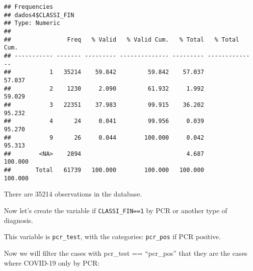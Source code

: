 \documentclass[
]{article}
\newenvironment{Shaded}{\begin{snugshade}}{\end{snugshade}}
\newcommand{\CommentTok}[1]{\textcolor[rgb]{0.56,0.35,0.01}{\textit{#1}}}
\newcommand{\DataTypeTok}[1]{\textcolor[rgb]{0.13,0.29,0.53}{#1}}
\newcommand{\DecValTok}[1]{\textcolor[rgb]{0.00,0.00,0.81}{#1}}
\newcommand{\KeywordTok}[1]{\textcolor[rgb]{0.13,0.29,0.53}{\textbf{#1}}}
\newcommand{\NormalTok}[1]{#1}
\newcommand{\OperatorTok}[1]{\textcolor[rgb]{0.81,0.36,0.00}{\textbf{#1}}}
\newcommand{\OtherTok}[1]{\textcolor[rgb]{0.56,0.35,0.01}{#1}}
\newcommand{\StringTok}[1]{\textcolor[rgb]{0.31,0.60,0.02}{#1}}
\begin{document}
\begin{verbatim}
## Frequencies  
## dados4$CLASSI_FIN  
## Type: Numeric  
## 
##                Freq   % Valid   % Valid Cum.   % Total   % Total Cum.
## ----------- ------- --------- -------------- --------- --------------
##           1   35214    59.842         59.842    57.037         57.037
##           2    1230     2.090         61.932     1.992         59.029
##           3   22351    37.983         99.915    36.202         95.232
##           4      24     0.041         99.956     0.039         95.270
##           9      26     0.044        100.000     0.042         95.313
##        <NA>    2894                              4.687        100.000
##       Total   61739   100.000        100.000   100.000        100.000
\end{verbatim}

\begin{Shaded}
\end{Shaded}

There are 35214 observations in the database.

Now let's create the variable if \texttt{CLASSI\_FIN==1} by PCR or
another type of diagnosis.

This variable is \texttt{pcr\_test}, with the categories:
\texttt{pcr\_pos} if PCR positive.

\begin{Shaded}
\end{Shaded}

Now we will filter the cases with pcr\_test == ``pcr\_pos'' that they
are the cases where COVID-19 only by PCR:
\end{document}
